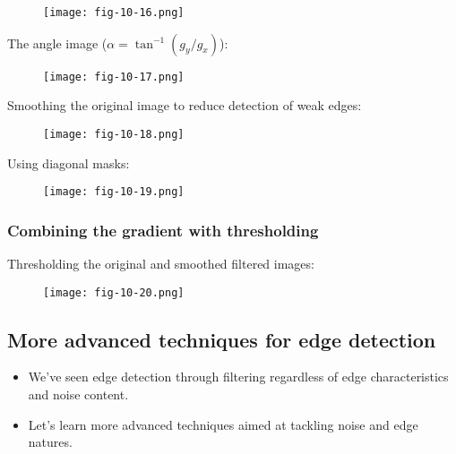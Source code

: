 \begin{frame}
\begin{figure}[!h]
\texttt{[image: fig-10-16.png]}
\end{figure}
\end{frame}

\begin{frame}
The angle image ($\alpha = \tan^{-1}(g_{y}/g_{x})$):
\begin{figure}[!h]
\texttt{[image: fig-10-17.png]}
\end{figure}
\end{frame}

\begin{frame}
Smoothing the original image to reduce detection of weak edges:
\begin{figure}[!h]
\texttt{[image: fig-10-18.png]}
\end{figure}
\end{frame}

\begin{frame}
Using diagonal masks:
\begin{figure}[!h]
\texttt{[image: fig-10-19.png]}
\end{figure}
\end{frame}

\subsubsection{Combining the gradient with thresholding}

\begin{frame}
Thresholding the original and smoothed filtered images:
\begin{figure}[!h]
\texttt{[image: fig-10-20.png]}
\end{figure}
\end{frame}

\subsection{More advanced techniques for edge detection}

\begin{frame}
\begin{itemize}
\item We've seen edge detection through filtering regardless of edge characteristics and noise content.
\item Let's learn more advanced techniques aimed at tackling noise and edge natures.
\end{itemize}
\end{frame}

